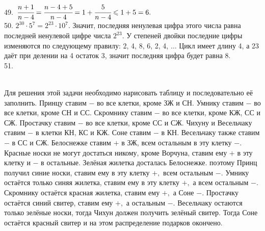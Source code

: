 \documentclass[12pt]{article}
\begin{document}
49. $\cfrac{n+1}{n-4}=\cfrac{n-4+5}{n-4}=1+\cfrac{5}{n-4}\leqslant1+5=6.$\\
50. $2^{30}\cdot5^7=2^{23}\cdot10^7.$ Значит, последняя ненулевая цифра этого числа равна последней ненулевой цифре числа $2^{23}.$ У степеней двойки последние цифры изменяются по следующему правилу: 2, 4, 8, 6, 2, 4, $\ldots$ Цикл имеет длину 4, а 23 даёт при делении на 4 остаток 3, значит последняя цифра будет равна 8.\\
51.
\begin{figure}[ht!]
\end{figure}\\
Для решения этой задачи необходимо нарисовать таблицу и последовательно её заполнить. Принцу ставим $-$ во все клетки, кроме ЗЖ и СН. Умнику ставим $-$ во все клетки, кроме СН и СС. Скромнику ставим $-$ во все клетки, кроме КЖ, СС и СЖ. Простачку ставим $-$ во все клетки, кроме СС и СЖ. Чихуну и Весельчаку ставим $-$ в клетки КН, КС и КЖ. Соне ставим $-$ в КН. Весельчаку также ставим $-$ в СС и СЖ. Белоснежке ставим $+$ в ЗЖ, всем остальным в эту клетку $-$. Красные носки не могут достаться никому, кроме Ворчуна, ставим ему $+$ в эту клетку и $-$ в остальные. Зелёная жилетка досталась Белоснежке. поэтому Принц получил синие носки, ставим ему в эту клетку $+,$ всем остальным $-.$ Умнику остаётся только синяя жилетка, ставим ему в эту клетку $+,$ а всем остальным $-.$ Скромнику остаётся красная жилетка, ставим ему $+,$ а Соне $-.$ Простачку остаётся синий свитер, ставим ему $+,$ а остальным $-.$ Весельчаку остаются только зелёные носки, тогда Чихун должен получить зелёный свитер. Тогда Соне остаётся красный свитер и на этом распределение подарков окончено.\\
\end{document}
